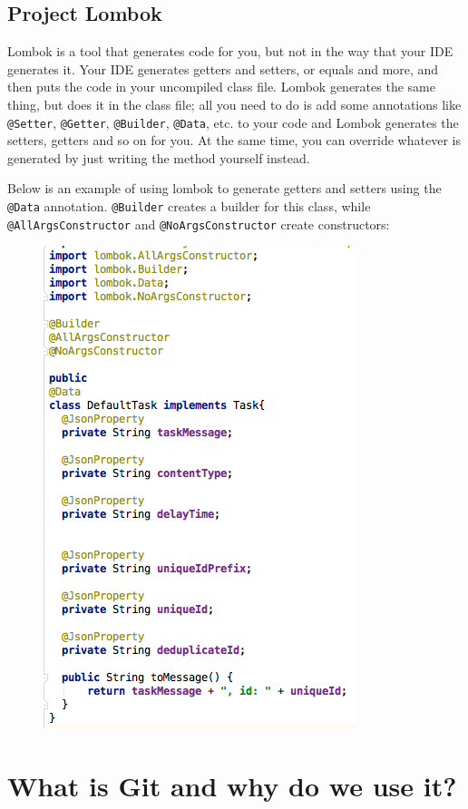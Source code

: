 \documentclass[oneside]{book}
\begin{document}
\section{Project Lombok}
Lombok is a tool that generates code for you, but not in the way that your IDE generates it. Your IDE generates getters and setters, or equals and more, and then puts the code in your uncompiled class file. Lombok generates the same thing, but does it in the class file; all you need to do is add some annotations like \texttt{@Setter}, \texttt{@Getter}, \texttt{@Builder}, \texttt{@Data}, etc. to your code and Lombok generates the setters, getters and so on for you. At the same time, you can override whatever is generated by just writing the method yourself instead.\par
Below is an example of using lombok to generate getters and setters using the \texttt{@Data} annotation. \texttt{@Builder} creates a builder for this class, while \texttt{@AllArgsConstructor} and \texttt{@NoArgsConstructor} create constructors:\par
\begin{figure}[h!]
\centering
	\includegraphics[scale=0.5]{lombok.png}
\end{figure}
\chapter{What is Git and why do we use it?}
\end{document}
